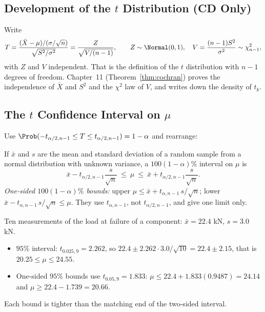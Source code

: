 \subsection{Development of the $t$ Distribution (CD Only)}

Write
\[ T=\frac{(\bar{X}-\mu)/(\sigma/\sqrt n)}{\sqrt{S^2/\sigma^2}}=\frac{Z}{\sqrt{V/(n-1)}},\qquad Z\sim\Normal(0,1),\quad V=\frac{(n-1)S^2}{\sigma^2}\sim\chi^2_{n-1}, \]
with $Z$ and $V$ independent. That is the definition of the $t$ distribution with $n-1$ degrees of freedom. Chapter~11 (Theorem~\ref{thm:cochran}) proves the independence of $\bar{X}$ and $S^2$ and the $\chi^2$ law of $V$, and writes down the density of $t_k$.

\subsection{The $t$ Confidence Interval on $\mu$}

Use $\Prob(-t_{\alpha/2,n-1}\le T\le t_{\alpha/2,n-1})=1-\alpha$ and rearrange:

\begin{theorem}[$t$ interval]\label{thm:t-ci}
If $\bar{x}$ and $s$ are the mean and standard deviation of a random sample from a normal distribution with unknown variance, a $100(1-\alpha)\%$ interval on $\mu$ is
\[ \bar{x}-t_{\alpha/2,n-1}\frac s{\sqrt n}\ \le\ \mu\ \le\ \bar{x}+t_{\alpha/2,n-1}\frac s{\sqrt n}. \]
\emph{One-sided $100(1-\alpha)\%$ bounds:} upper $\mu\le\bar{x}+t_{\alpha,n-1}\,s/\sqrt n$; lower $\bar{x}-t_{\alpha,n-1}\,s/\sqrt n\le\mu$. They use $t_{\alpha,n-1}$, not $t_{\alpha/2,n-1}$, and give one limit only.
\end{theorem}

\begin{example}\label{ex:t-ci}
Ten measurements of the load at failure of a component: $\bar{x}=22.4$ kN, $s=3.0$ kN.
\begin{itemize}
  \item $95\%$ interval: $t_{0.025,9}=2.262$, so $22.4\pm2.262\cdot3.0/\sqrt{10}=22.4\pm2.15$, that is $20.25\le\mu\le24.55$.
  \item One-sided $95\%$ bounds use $t_{0.05,9}=1.833$: $\mu\le22.4+1.833(0.9487)=24.14$ and $\mu\ge22.4-1.739=20.66$.
\end{itemize}
Each bound is tighter than the matching end of the two-sided interval.
\end{example}

